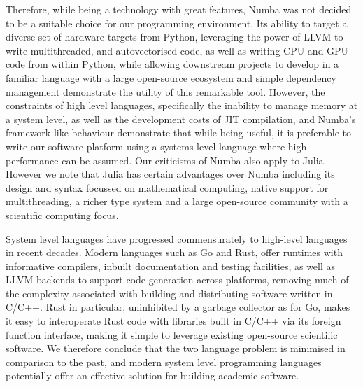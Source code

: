 Therefore, while being a technology with great features, Numba was not decided to be a suitable choice for our programming environment. Its ability to target a diverse set of hardware targets from Python, leveraging the power of LLVM to write multithreaded, and autovectorised code, as well as writing CPU and GPU code from within Python, while allowing downstream projects to develop in a familiar language with a large open-source ecosystem and simple dependency management demonstrate the utility of this remarkable tool. However, the constraints of high level languages, specifically the inability to manage memory at a system level, as well as the development costs of JIT compilation, and Numba's framework-like behaviour demonstrate that while being useful, it is preferable to write our software platform using a systems-level language where high-performance can be assumed. Our criticisms of Numba also apply to Julia. However we note that Julia has certain advantages over Numba including its design and syntax focussed on mathematical computing, native support for multithreading, a richer type system and a large open-source community with a scientific computing focus.

System level languages have progressed commensurately to high-level languages in recent decades. Modern languages such as Go and Rust, offer runtimes with informative compilers, inbuilt documentation and testing facilities, as well as LLVM backends to support code generation across platforms, removing much of the complexity associated with building and distributing software written in C/C++. Rust in particular, uninhibited by a garbage collector as for Go, makes it easy to interoperate Rust code with libraries built in C/C++ via its foreign function interface, making it simple to leverage existing open-source scientific software.  We therefore conclude that the two language problem is minimised in comparison to the past, and modern system level programming languages potentially offer an effective solution for building academic software.


